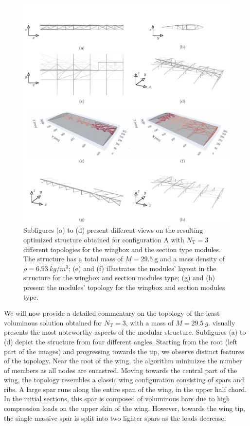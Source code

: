 \begin{figure}
    \centering
    \includegraphics[width=\linewidth]{figures/07_aeronautic/00_NACA_a_sol_3/gs_a.pdf}
        \caption{Subfigures (a) to (d) present different views on the resulting optimized structure obtained for configuration A with $N_\text{T}=3$ different topologies for the wingbox and the section type modules. The structure has a total mass of $M=\qty{29.5}{\gram}$ and a mass density of $\bar{\rho}=\qty{6.93}{kg/m^3}$; (e) and (f) illustrates the modules' layout in the structure for the wingbox and section modules type; (g) and (h) present the modules' topology for the wingbox and section modules type.}
    \label{fig:07_naca_sol_a_nt3}
\end{figure}

We will now provide a detailed commentary on the topology of the least voluminous solution obtained for $N_\text{T}=3$, with a mass of $M=\qty{29.5}{g}$.  visually presents the most noteworthy aspects of the modular structure. Subfigures (a) to (d) depict the structure from four different angles. Starting from the root (left part of the images) and progressing towards the tip, we observe distinct features of the topology. Near the root of the wing, the algorithm minimizes the number of members as all nodes are encastred. Moving towards the central part of the wing, the topology resembles a classic wing configuration consisting of spars and ribs. A large spar runs along the entire span of the wing, in the upper half chord. In the initial sections, this spar is composed of voluminous bars due to high compression loads on the upper skin of the wing. However, towards the wing tip, the single massive spar is split into two lighter spars as the loads decrease.

